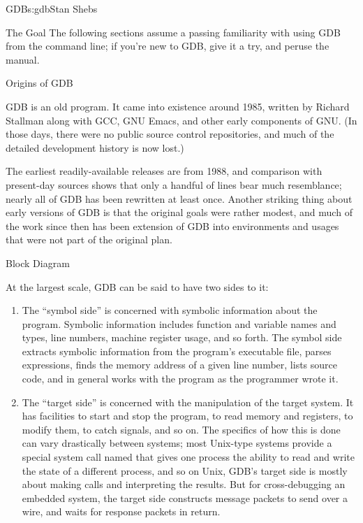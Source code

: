 \begin{aosachapter}{GDB}{s:gdb}{Stan Shebs}
\begin{aosasect1}{The Goal}
The following sections assume a passing familiarity with using GDB
from the command line; if you're new to GDB, give it a try, and peruse
the manual.\cite{bib:gdb-manual}

\end{aosasect1}

\begin{aosasect1}{Origins of GDB}

GDB is an old program.  It came into existence around 1985, written by
Richard Stallman along with GCC, GNU Emacs, and other early components
of GNU.  (In those days, there were no public source control
repositories, and much of the detailed development history is now
lost.)

The earliest readily-available releases are from 1988, and comparison
with present-day sources shows that only a handful of lines bear much
resemblance; nearly all of GDB has been rewritten at least once.
Another striking thing about early versions of GDB is that the
original goals were rather modest, and much of the work since then has
been extension of GDB into environments and usages that were not part
of the original plan.

\end{aosasect1}

\begin{aosasect1}{Block Diagram}


At the largest scale, GDB can be said to have two sides to it:

\begin{enumerate}
\item The ``symbol side'' is concerned with symbolic information about
the program.  Symbolic information includes function and variable
names and types, line numbers, machine register usage, and so forth.
The symbol side extracts symbolic information from the program's
executable file, parses expressions, finds the memory address of a
given line number, lists source code, and in general works with
the program as the programmer wrote it.

\item The ``target side'' is concerned with the manipulation of the
target system.  It has facilities to start and stop the program, to
read memory and registers, to modify them, to catch signals, and so
on.  The specifics of how this is done can vary drastically between
systems; most Unix-type systems provide a special system call named
 that gives one process the ability to read and write the
state of a different process, and so on Unix, GDB's target side is
mostly about making  calls and interpreting the results.
But for cross-debugging an embedded system, the target side constructs
message packets to send over a wire, and waits for response packets in
return.
\end{enumerate}


\end{aosasect1}
\end{aosachapter}
